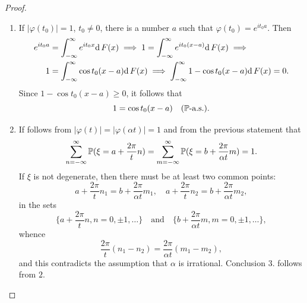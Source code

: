 \begin{proof}
\begin{enumerate}
    \item If $|\varphi(t_0)| = 1$, $t_0 \ne 0$, there is a number $a$ such that $\varphi(t_0) = e^{i t_0 a}$. Then
    \begin{align*}
        e^{i t_0 a} &= \int_{-\infty}^\infty e^{i t_0 x} \mathrm{d} \, F(x) \implies 1 = \int_{-\infty}^\infty e^{i t_0 (x-a)} \mathrm{d} \, F(x) \implies \\
        1 &= \int_{-\infty}^\infty \cos{ t_0 (x-a)} \mathrm{d} \, F(x) \implies \int_{-\infty}^\infty 1 - \cos{ t_0 (x-a)} \mathrm{d} \, F(x) = 0.
    \end{align*}
    Since $1 - \cos{t_0(x-a)} \ge 0$, it follows that 
    \begin{equation*}
        1 = \cos t_0(x-a) \quad (\mathbb{P}\text{-a.s.}).
    \end{equation*}
    \item If follows from $|\varphi(t)| = |\varphi(\alpha t)| = 1$ and from the previous statement that
    \begin{equation*}
        \sum_{n=-\infty}^{\infty} \mathbb{P}(\xi = a + \frac{2\pi}{t}n) = \sum_{m=-\infty}^{\infty} \mathbb{P}(\xi = b + \frac{2\pi}{\alpha t} m) = 1.
    \end{equation*}
    If $\xi$ is not degenerate, then there must be at least two common points:
    \begin{equation*}
        a + \frac{2\pi}{t} n_1 = b + \frac{2\pi}{ \alpha t} m_1, \quad a + \frac{2\pi}{t} n_2 = b + \frac{2\pi}{ \alpha t} m_2,
    \end{equation*}
    in the sets 
    \begin{equation*}
        \bigg\{ a + \frac{2\pi}{t}n, n=0, \pm 1, \dots \bigg\} \quad \text{and} \quad \bigg\{ b + \frac{2\pi}{\alpha t}m, m=0, \pm 1, \dots \bigg\},
    \end{equation*}
    whence 
    \begin{equation*}
        \frac{2\pi}{t}(n_1 - n_2) = \frac{2\pi}{\alpha t} (m_1 - m_2),
    \end{equation*}
    and this contradicts the assumption that $\alpha$ is irrational. Conclusion $3.$ follows from $2.$
\end{enumerate}
\end{proof}
